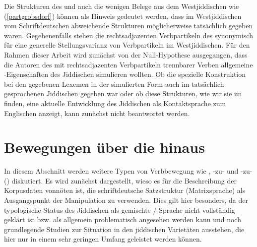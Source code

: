 
Die Strukturen des \hai{{\LiJi}} und auch die wenigen Belege aus dem Westjiddischen wie (\ref{partgrobsdorf}) können als Hinweis gedeutet werden, dass im Westjiddischen vom Schriftdeutschen abweichende Strukturen möglicherweise tatsächlich gegeben waren.  Gegebenenfalls stehen die rechtsadjazenten Verbpartikeln des \hai{{\LiJieins}} synonymisch für eine generelle Stellungsvarianz von Verbpartikeln im Westjiddischen. Für den Rahmen dieser Arbeit wird zunächst von der Null-Hypothese ausgegangen, dass die Autoren des \hai{{\LiJi}} mit rechtsadjazenten Verbpartikeln trennbarer Verben allgemeine \hai{{\VO}}-Eigenschaften des Jiddischen simulieren wollten. Ob die spezielle Konstruktion bei den gegebenen Lexemen in der simulierten Form auch im tatsächlich gesprochenen Jiddischen gegeben war oder ob diese Strukturen, wie wir sie im  finden, eine aktuelle Entwicklung des Jiddischen als Kontaktsprache zum Englischen anzeigt, kann zunächst nicht beantwortet werden.     
   
      \section{Bewegungen über die  hinaus}\label{overraising} %
  In diesem Abschnitt werden weitere Typen von Verbbewegung wie \hai{{\VPR}}, -zu- und -zu- () diskutiert. Es wird zunächst dargestellt, wieso es  für die Beschreibung der Korpusdaten vonnöten ist, die schriftdeutsche Satzstruktur (Matrixsprache) als Ausgangspunkt der Manipulation zu verwenden. Dies gilt hier besonders, da der typologische Status des Jiddischen als gemischte \hai{{\OV}}/\hai{{\VO}}-Spra\-che nicht vollständig geklärt ist bzw. als allgemein problematisch angesehen werden kann und noch grundlegende Studien zur Situation in den jiddischen Varietäten ausstehen, die hier nur in einem sehr geringen Umfang geleistet werden können. 
  
